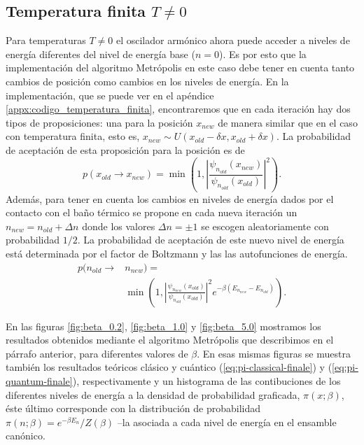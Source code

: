 \documentclass[%
 reprint,
 amsmath,amssymb,
 aps,
 pra,
]{revtex4-2}
\begin{document}
\subsection{Temperatura finita \texorpdfstring{$T \neq 0$}{T diferente de cero}\label{subsec:temperatura-finita}}
Para temperaturas $T\neq0$ el oscilador armónico ahora puede acceder a niveles de energía diferentes del nivel de energía base  ($n=0$). Es por esto que la implementación del algoritmo Metrópolis en este caso debe tener en cuenta tanto cambios de posición como cambios en los niveles de energía. En la implementación, que se puede ver en el apéndice \ref{appx:codigo_temperatura_finita}, encontraremos que en cada iteración hay dos tipos de proposiciones: una para la posición $x_{new}$ de manera similar que en el caso con temperatura finita, esto es, $x_{new} \sim U(x_{old} - \delta x, x_{old} + \delta x)$. La probabilidad de aceptación de esta proposición para la posición es de 
\begin{equation}
	p(x_{old} \rightarrow x_{new}) = \min\left(1,\left|\frac{\psi_{n_{old}}(x_{new})}{\psi_{n_{old}}(x_{old})}\right|^2\right).
\end{equation}
Además, para tener en cuenta los cambios en niveles de energía dados por el contacto con el baño térmico se propone en cada nueva iteración un $n_{new}=n_{old} + \Delta n$ donde los valores $\Delta n = \pm 1$ se escogen aleatoriamente con probabilidad $1/2$. La probabilidad de aceptación de este nuevo nivel de energía está determinada por el factor de Boltzmann y las las autofunciones de energía.
\begin{align}
	p(n_{old} \rightarrow 	& n_{new}) = \nonumber \\
							& \min\left(1,\left|\frac{\psi_{n_{new}}(x_{old})}{\psi_{n_{old}}(x_{old})}\right|^2 e^{-\beta\left(E_{n_{new}}-E_{n_{old}}\right)}\right).
\end{align}

En las figuras \ref{fig:beta_0.2}, \ref{fig:beta_1.0} y \ref{fig:beta_5.0} mostramos los resultados obtenidos mediante el algoritmo Metrópolis que describimos en el párrafo anterior, para diferentes valores de $\beta$. En esas mismas figuras se muestra también los resultados teóricos clásico y cuántico (\ref{eq:pi-classical-finale}) y (\ref{eq:pi-quantum-finale}), respectivamente y un histograma de las contibuciones de los diferentes niveles de energía a la densidad de probabilidad graficada, $\pi(x;\beta)$, éste último corresponde con la distribución de probabilidad $\pi(n;\beta)=e^{-\beta E_n }/Z(\beta)$ –la asociada a cada nivel de energía en el ensamble canónico.
\end{document}
